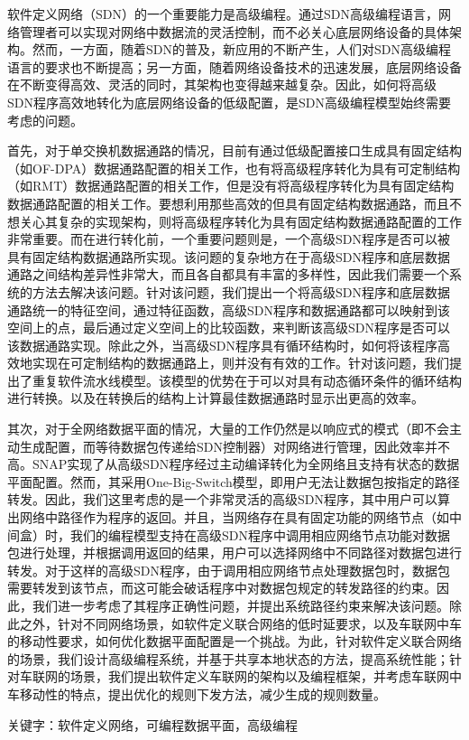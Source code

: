 \documentclass{ctexart}
\begin{document}
软件定义网络（SDN）的一个重要能力是高级编程。通过SDN高级编程语言，网络管理者可以实现对网络中数据流的灵活控制，而不必关心底层网络设备的具体架构。然而，一方面，随着SDN的普及，新应用的不断产生，人们对SDN高级编程语言的要求也不断提高；另一方面，随着网络设备技术的迅速发展，底层网络设备在不断变得高效、灵活的同时，其架构也变得越来越复杂。因此，如何将高级SDN程序高效地转化为底层网络设备的低级配置，是SDN高级编程模型始终需要考虑的问题。

首先，对于单交换机数据通路的情况，目前有通过低级配置接口生成具有固定结构（如OF-DPA）数据通路配置的相关工作，也有将高级程序转化为具有可定制结构（如RMT）数据通路配置的相关工作，但是没有将高级程序转化为具有固定结构数据通路配置的相关工作。要想利用那些高效的但具有固定结构数据通路，而且不想关心其复杂的实现架构，则将高级程序转化为具有固定结构数据通路配置的工作非常重要。而在进行转化前，一个重要问题则是，一个高级SDN程序是否可以被具有固定结构数据通路所实现。该问题的复杂地方在于高级SDN程序和底层数据通路之间结构差异性非常大，而且各自都具有丰富的多样性，因此我们需要一个系统的方法去解决该问题。针对该问题，我们提出一个将高级SDN程序和底层数据通路统一的特征空间，通过特征函数，高级SDN程序和数据通路都可以映射到该空间上的点，最后通过定义空间上的比较函数，来判断该高级SDN程序是否可以该数据通路实现。除此之外，当高级SDN程序具有循环结构时，如何将该程序高效地实现在可定制结构的数据通路上，则并没有有效的工作。针对该问题，我们提出了重复软件流水线模型。该模型的优势在于可以对具有动态循环条件的循环结构进行转换。以及在转换后的结构上计算最佳数据通路时显示出更高的效率。

其次，对于全网络数据平面的情况，大量的工作仍然是以响应式的模式（即不会主动生成配置，而等待数据包传递给SDN控制器）对网络进行管理，因此效率并不高。SNAP实现了从高级SDN程序经过主动编译转化为全网络且支持有状态的数据平面配置。然而，其采用One-Big-Switch模型，即用户无法让数据包按指定的路径转发。因此，我们这里考虑的是一个非常灵活的高级SDN程序，其中用户可以算出网络中路径作为程序的返回。并且，当网络存在具有固定功能的网络节点（如中间盒）时，我们的编程模型支持在高级SDN程序中调用相应网络节点功能对数据包进行处理，并根据调用返回的结果，用户可以选择网络中不同路径对数据包进行转发。对于这样的高级SDN程序，由于调用相应网络节点处理数据包时，数据包需要转发到该节点，而这可能会破话程序中对数据包规定的转发路径的约束。因此，我们进一步考虑了其程序正确性问题，并提出系统路径约束来解决该问题。除此之外，针对不同网络场景，如软件定义联合网络的低时延要求，以及车联网中车的移动性要求，如何优化数据平面配置是一个挑战。为此，针对软件定义联合网络的场景，我们设计高级编程系统，并基于共享本地状态的方法，提高系统性能；针对车联网的场景，我们提出软件定义车联网的架构以及编程框架，并考虑车联网中车移动性的特点，提出优化的规则下发方法，减少生成的规则数量。

关键字：软件定义网络，可编程数据平面，高级编程
\end{document}
